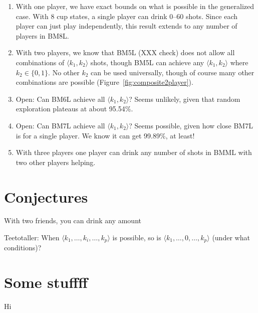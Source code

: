 \documentclass[twocolumn]{article}
\begin{document}
\begin{enumerate}
  \item With one player, we have exact bounds on what is possible in
    the generalized case. With 8 cup states, a single player can
    drink 0--60 shots. Since each player can just play independently,
    this result extends to any number of players in BM8L.
  \item With two players, we know that BM5L (XXX check) does not allow
    all combinations of $\langle k_1, k_2 \rangle$ shots, though BM5L
    can achieve any $\langle k_1, k_2 \rangle$ where $k_2 \in \{ 0, 1
    \}$. No other $k_2$ can be used universally, though of course many
    other combinations are possible
    (Figure~\ref{fig:composite2player}).
  \item Open: Can BM6L achieve all $\langle k_1, k_2 \rangle$? Seems
    unlikely, given that random exploration plateaus at about 95.54\%.
  \item Open: Can BM7L achieve all $\langle k_1, k_2 \rangle$? Seems
    possible, given how close BM7L is for a single player. We know it
    can get 99.89\%, at least!
  \item With three players one player can drink any number of shots in
    BMML with two other players helping.
\end{enumerate}

\section{Conjectures} \label{sec:conjectures}

With two friends, you can drink any amount

Teetotaller: When $\langle k_1, \ldots, k_i, \ldots, k_p \rangle$ is possible,
so is $\langle k_1, \ldots, 0, \ldots, k_p \rangle$ (under what conditions)?

\section{Some stuffff}

Hi




{}

\end{document}
